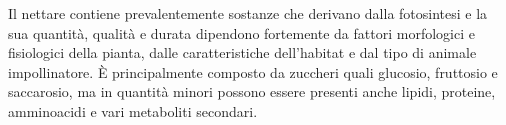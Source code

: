 \documentclass[main.tex]{subfiles}
\begin{document}
Il nettare contiene prevalentemente sostanze che derivano dalla fotosintesi e la sua quantità, qualità e durata dipendono fortemente da fattori morfologici e fisiologici della pianta, dalle caratteristiche dell’habitat e dal tipo di animale impollinatore. È principalmente composto da zuccheri quali glucosio, fruttosio e saccarosio, ma in quantità minori possono essere presenti anche lipidi, proteine, amminoacidi e vari metaboliti secondari.
\end{document}
